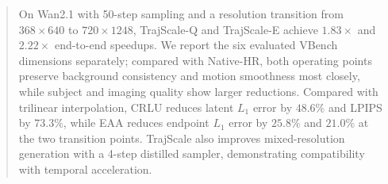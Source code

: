 \documentclass[letterpaper]{article} %
\begin{document}
\begin{abstract}
On Wan2.1 with 50-step sampling and a resolution transition from \(368\times640\) to \(720\times1248\), TrajScale-Q and TrajScale-E achieve \(1.83\times\) and \(2.22\times\) end-to-end speedups. We report the six evaluated VBench dimensions separately; compared with Native-HR, both operating points preserve background consistency and motion smoothness most closely, while subject and imaging quality show larger reductions. Compared with trilinear interpolation, CRLU reduces latent \(L_1\) error by \(48.6\%\) and LPIPS by \(73.3\%\), while EAA reduces endpoint \(L_1\) error by \(25.8\%\) and \(21.0\%\) at the two transition points. TrajScale also improves mixed-resolution generation with a 4-step distilled sampler, demonstrating compatibility with temporal acceleration.
\end{abstract}




\end{document}
